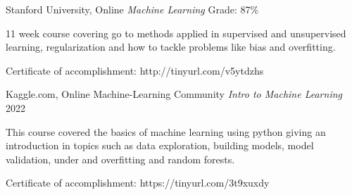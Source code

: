 

\begin{cventries}

\cventry
  {Stanford University, Online} %
  {\textit{Machine Learning}}
  {Grade: 87\%} %
  {} %
  {
    \begin{cvitems} %
      \item {11 week course covering go to methods applied in supervised and unsupervised learning, regularization and how to tackle problems like bias and overfitting.}
      \item {Certificate of accomplishment: http://tinyurl.com/v5ytdzhs}
    \end{cvitems}
  }
  \newline
\cventry
  {Kaggle.com, Online Machine-Learning Community} %
  {\textit{Intro to Machine Learning}}
  {} %
  {2022} %
  {
    \begin{cvitems} %
      \item {This course covered the basics of machine learning using python giving an introduction in topics such as data exploration, building models, model validation, under and overfitting and random forests.}
      \item {Certificate of accomplishment: https://tinyurl.com/3t9xuxdy}
    \end{cvitems}
  }
  \newline


\end{cventries}
